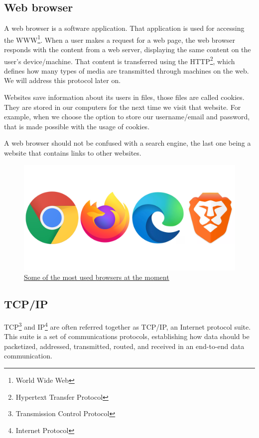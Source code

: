 \documentclass{article}
\newcommand\tab[1][1cm]{\hspace*{#1}}
\begin{document}
\newpage

\subsection{Web browser}

\tab A web browser is a software application. That application is used for accessing the WWW\footnote{World Wide Web}. When a user makes a request for a web page, the web browser responds with the content from a web server, displaying the same content on the user's device/machine. That content is transferred using the HTTP\footnote{Hypertext Transfer Protocol}, which defines how many types of media are transmitted through machines on the web. We will address this protocol later on.

Websites save information about its users in files, those files are called cookies. They are stored in our computers for the next time we visit that website. For example, when we choose the option to store our username/email and password, that is made possible with the usage of cookies.

A web browser should not be confused with a search engine, the last one being a website that contains links to other websites.

\begin{figure}[H]
    \begin{center}
        \includegraphics[width=0.3 \textwidth]{images/browsers.png}
        \caption{\href{https://www.google.com/url?sa=i&url=https\%3A\%2F\%2Fventurebeat.com\%2F2020\%2F01\%2F15\%2Fbrowser-benchmark-battle-january-2020-chrome-firefox-edge-brave\%2F&psig=AOvVaw1kepSAmHxWnyx7E\_xnjq2a&ust=1617098633832000&source=images&cd=vfe&ved=0CAIQjRxqFwoTCJjgy\_-f1e8CFQAAAAAdAAAAABAD}{\underline{Some of the most used browsers at the moment}}}
    \end{center}
\end{figure}

\subsection{TCP/IP}

\tab TCP\footnote{Transmission Control Protocol} and IP\footnote{Internet Protocol} are often referred together as TCP/IP, an Internet protocol suite. This suite is a set of communications protocols, establishing how data should be packetized, addressed, transmitted, routed, and received in an end-to-end data communication.
\end{document}
